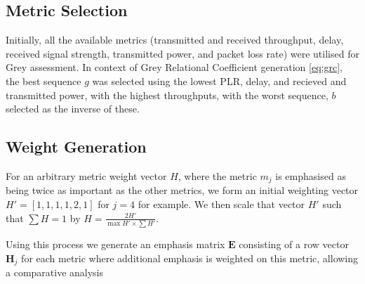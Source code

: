 \documentclass[runningheads,a4paper]{llncs}
\begin{document}
{{\subsection{Metric Selection}

Initially, all the available metrics (transmitted and received throughput, delay, received signal strength, transmitted power, and packet loss rate) were utilised for Grey assessment. 
In context of Grey Relational Coefficient generation \eqref{eq:grc}, the best sequence $g$ was selected using the lowest PLR, delay, and recieved and transmitted power, with the highest throughputs, with the worst sequence, $b$ selected as the inverse of these.

\subsection{Weight Generation}

For an arbitrary metric weight vector $H$, where the metric $m_j$ is emphasised as being twice as important as the other metrics, we form an initial weighting vector $H' = [1,1,1,1,2,1]$ for $j=4$ for example. We then scale that vector $H'$ such that $\sum H = 1$ by $H= \frac{2 H'}{\max{H'}\times \sum H'}$.

Using this process we generate an emphasis matrix $\mathbf{E}$ consisting of a row vector $\mathbf{H}_j$ for each metric where additional emphasis is weighted on this metric, allowing a comparative analysis 

}}
\end{document}
